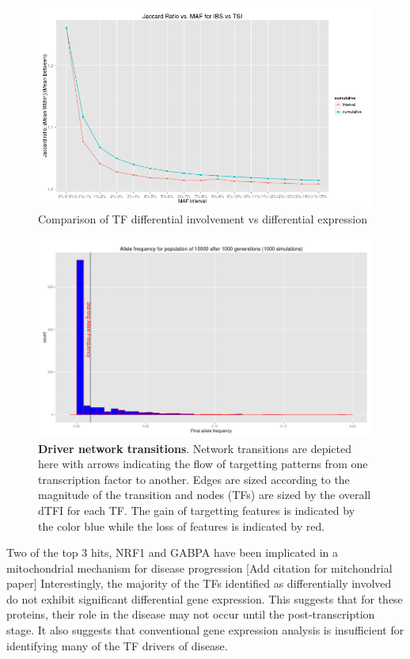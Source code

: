 \documentclass[english]{article}
\begin{document}
\begin{figure}[h]
\includegraphics[width=1\columnwidth]{pasted7}\caption{Comparison of TF differential involvement vs differential expression}
\end{figure}


\begin{figure}[h]
\includegraphics[width=0.8\columnwidth]{pasted8}\caption{\textbf{Driver network transitions}. Network transitions are depicted
here with arrows indicating the flow of targetting patterns from one
transcription factor to another. Edges are sized according to the
magnitude of the transition and nodes (TFs) are sized by the overall
dTFI for each TF. The gain of targetting features is indicated by
the color blue while the loss of features is indicated by red.}
\end{figure}


Two of the top 3 hits, NRF1 and GABPA have been implicated in a mitochondrial
mechanism for disease progression {[}Add citation for mitchondrial
paper{]} Interestingly, the majority of the TFs identified as differentially
involved do not exhibit significant differential gene expression.
This suggests that for these proteins, their role in the disease may
not occur until the post-transcription stage. It also suggests that
conventional gene expression analysis is insufficient for identifying
many of the TF drivers of disease.
\end{document}
